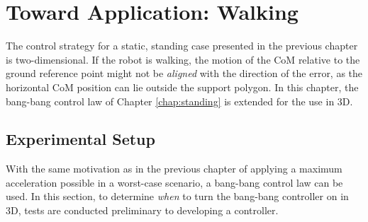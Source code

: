 %
\chapter{Toward Application: Walking}\label{chap:walking}
The control strategy for a static, standing case presented in the previous chapter is two-dimensional. If the robot is walking, the motion of the \ac{CoM} relative to the ground reference point might not be \textit{aligned} with the direction of the error, as the horizontal \ac{CoM} position can lie outside the support polygon. In this chapter, the bang-bang control law of Chapter \ref{chap:standing} is extended for the use in \ac{3D}.
\section{Experimental Setup}
With the same motivation as in the previous chapter of applying a maximum acceleration possible in a worst-case scenario, a bang-bang control law can be used. In this section, to determine \textit{when} to turn the bang-bang controller on in \ac{3D},  tests are conducted preliminary to developing a controller. 

